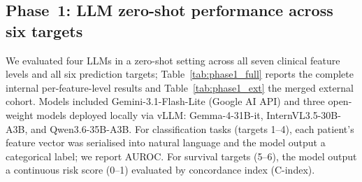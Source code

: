 \documentclass[pdflatex,sn-nature]{sn-jnl}
\begin{document}
\subsection{Phase~1: LLM zero-shot performance across six targets}
\label{sec:phase1}

We evaluated four LLMs in a zero-shot setting across all seven
clinical feature levels and all six prediction targets; Table~\ref{tab:phase1_full}
reports the complete internal per-feature-level results and
Table~\ref{tab:phase1_ext} the merged external cohort.
Models included Gemini-3.1-Flash-Lite (Google AI API) and three
open-weight models deployed locally via vLLM: Gemma-4-31B-it,
InternVL3.5-30B-A3B, and Qwen3.6-35B-A3B.
For classification tasks (targets 1--4), each patient's feature vector
was serialised into natural language and the model output a categorical
label; we report AUROC.
For survival targets (5--6), the model output a continuous risk score
(0--1) evaluated by concordance index (C-index).
\end{document}
